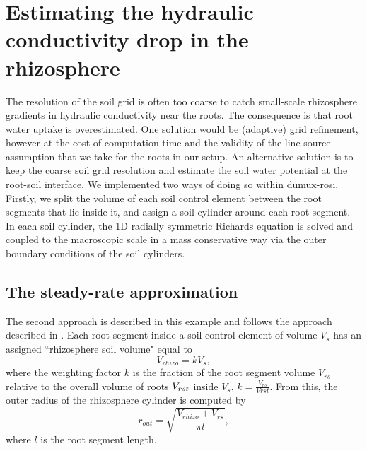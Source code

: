 \newpage
\section{Estimating the hydraulic conductivity drop in the rhizosphere} \label{sec:hydro_rhizo}
The resolution of the soil grid is often too coarse to catch small-scale rhizosphere gradients in hydraulic conductivity near the roots. The consequence is that root water uptake is overestimated. One solution would be (adaptive) grid refinement, however at the cost of computation time and the validity of the line-source assumption that we take for the roots in our setup. 
An alternative solution is to keep the coarse soil grid resolution and estimate the soil water potential at the root-soil interface. We implemented two ways of doing so within dumux-rosi. Firstly, we split the volume of each soil control element between the root segments that lie inside it, and assign a soil cylinder around each root segment. In each soil cylinder, the 1D radially symmetric Richards equation is solved and coupled to the macroscopic scale in a mass conservative way via the outer boundary conditions of the soil cylinders. 

\subsection{The steady-rate approximation}
The second approach is described in this example and follows the approach described in \cite{Schroeder2008}. Each root segment inside a soil control element of volume $V_s$ has an assigned ``rhizosphere soil volume" equal to $$V_{rhizo} = k V_s,$$ where the weighting factor $k$ is the fraction of the root segment volume $V_{rs}$ relative to the overall volume of roots $V_{rst\textsc{}}$ inside $V_s$, $k=\frac{V_{rs}}{V{rst}}$. 
From this, the outer radius of the rhizosphere cylinder is computed by 
$$r_{out}=\sqrt{\frac{V_{rhizo}+V_{rs}}{\pi l}},$$ where $l$ is the root segment length. 


